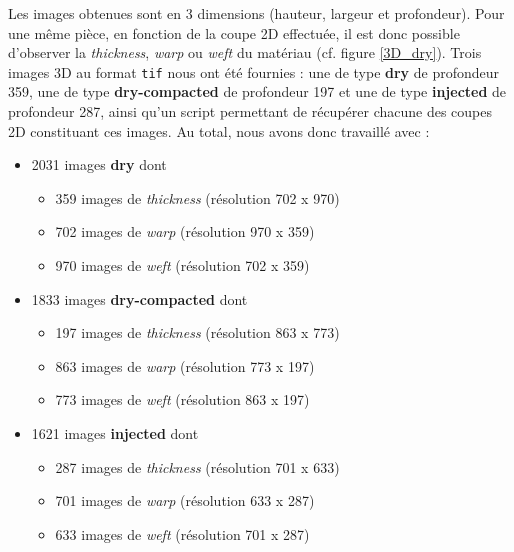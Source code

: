 \documentclass{article}
\begin{document}
Les images obtenues sont en 3 dimensions (hauteur, largeur et profondeur). Pour une même pièce, en fonction de la coupe 2D effectuée, il est donc possible d'observer la \textit{thickness}, \textit{warp} ou \textit{weft} du matériau (cf. figure \ref{3D_dry}). Trois images 3D au format \texttt{tif} nous ont été fournies : une de type \textbf{dry} de profondeur 359, une de type \textbf{dry-compacted} de profondeur 197 et une de type \textbf{injected} de profondeur 287, ainsi qu'un script permettant de récupérer chacune des coupes 2D constituant ces images. Au total, nous avons donc travaillé avec :
\begin{itemize}
    \item 2031 images \textbf{dry} dont
    \begin{itemize}
        \item 359 images de \textit{thickness} (résolution 702 x 970)
        \item 702 images de \textit{warp} (résolution 970 x 359)
        \item 970 images de \textit{weft} (résolution 702 x 359)
    \end{itemize}
    \item 1833 images \textbf{dry-compacted} dont
    \begin{itemize}
        \item 197 images de \textit{thickness} (résolution 863 x 773)
        \item 863 images de \textit{warp} (résolution 773 x 197)
        \item 773 images de \textit{weft} (résolution 863 x 197)
    \end{itemize}
    \item 1621 images \textbf{injected} dont
    \begin{itemize}
        \item 287 images de \textit{thickness} (résolution 701 x 633)
        \item 701 images de \textit{warp} (résolution 633 x 287)
        \item 633 images de \textit{weft} (résolution 701 x 287)
    \end{itemize}
\end{itemize}
\end{document}

